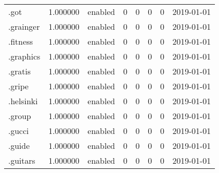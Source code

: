 \begin{tabular}{lrlrrrrl}
.got                      &          1.000000 &         enabled &                           0 &                           0 &                           0 &                   0 &           2019-01-01 \\
.grainger                 &          1.000000 &         enabled &                           0 &                           0 &                           0 &                   0 &           2019-01-01 \\
.fitness                  &          1.000000 &         enabled &                           0 &                           0 &                           0 &                   0 &           2019-01-01 \\
.graphics                 &          1.000000 &         enabled &                           0 &                           0 &                           0 &                   0 &           2019-01-01 \\
.gratis                   &          1.000000 &         enabled &                           0 &                           0 &                           0 &                   0 &           2019-01-01 \\
.gripe                    &          1.000000 &         enabled &                           0 &                           0 &                           0 &                   0 &           2019-01-01 \\
.helsinki                 &          1.000000 &         enabled &                           0 &                           0 &                           0 &                   0 &           2019-01-01 \\
.group                    &          1.000000 &         enabled &                           0 &                           0 &                           0 &                   0 &           2019-01-01 \\
.gucci                    &          1.000000 &         enabled &                           0 &                           0 &                           0 &                   0 &           2019-01-01 \\
.guide                    &          1.000000 &         enabled &                           0 &                           0 &                           0 &                   0 &           2019-01-01 \\
.guitars                  &          1.000000 &         enabled &                           0 &                           0 &                           0 &                   0 &           2019-01-01 \\

\end{tabular}

